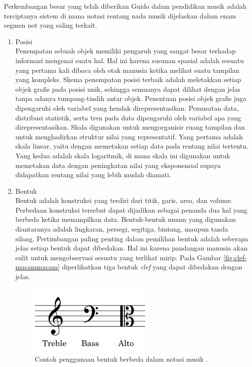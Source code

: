 Perkembangan besar yang telah diberikan Guido dalam pendidikan musik adalah terciptanya sistem di mana notasi rentang nada musik dijelaskan dalam enam segmen not yang saling terkait.
\begin{enumerate}
    \item Posisi \\
    Penempatan sebuah objek memiliki pengaruh yang sangat besar terhadap informasi mengenai suatu hal. Hal ini karena susunan spasial adalah sesuatu yang pertama kali dibaca oleh otak manusia ketika melihat suatu tampilan yang kompleks. Skema penempatan posisi terbaik adalah meletakkan setiap objek grafis pada posisi unik, sehingga semuanya dapat dilihat dengan jelas tanpa adanya tumpang-tindih antar objek. Penentuan posisi objek grafis juga dipengaruhi oleh variabel yang hendak direpresentasikan. Pemusatan data, distribusi statistik, serta tren pada data dipengaruhi oleh variabel apa yang direpresentasikan. Skala digunakan untuk mengorganisir ruang tampilan dan untuk menghadirkan struktur nilai yang representatif. Yang pertama adalah skala linear, yaitu dengan memetakan setiap data pada rentang nilai tertentu. Yang kedua adalah skala logaritmik, di mana skala ini digunakan untuk memetakan data dengan peningkatan nilai yang eksponensial supaya didapatkan rentang nilai yang lebih mudah diamati.
    \item Bentuk \\
    Bentuk adalah konstruksi yang terdiri dari titik, garis, area, dan volume. Perbedaan konstruksi tersebut dapat dijadikan sebagai penanda dua hal yang berbeda ketika menampilkan data. Bentuk-bentuk umum yang digunakan diantaranya adalah lingkaran, persegi, segitiga, bintang, maupun tanda silang. Pertimbangan paling penting dalam pemilihan bentuk adalah seberapa jelas setiap bentuk dapat dibedakan. Hal ini karena pandangan manusia akan sulit untuk mengobservasi sesuatu yang terlihat mirip. Pada Gambar \ref{fig:clef-macammacam} diperlihatkan tiga bentuk \textit{clef} yang dapat dibedakan dengan jelas. \begin{figure}[t!]
        \centering
        \includegraphics[width=6cm]{Gambar/clef-macam-macam.jpg}
        \caption{Contoh penggunaan bentuk berbeda dalam notasi musik \cite{bukuTeoriMusik}.}

\end{figure}
\end{enumerate}
